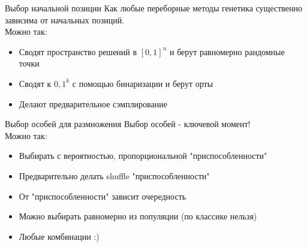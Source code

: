 \documentclass[14pt, fleqn, xcolor={dvipsnames, table}]{beamer}
\begin{document}
\begin{frame}{Выбор начальной позиции}
Как любые переборные методы генетика существенно зависима от начальных позиций. \\
Можно так:
\begin{itemize}
  \item Сводят пространство решений в $[0,1]^n$ и берут равномерно рандомные точки
  \item Сводят к ${0,1}^k$ с помощью бинаризации и берут орты
  \item Делают предварительное сэмплирование
\end{itemize}
\end{frame}

\begin{frame}{Выбор особей для размножения}
Выбор особей - ключевой момент! \\
Можно так:
\begin{itemize}
  \item Выбирать с вероятностью, пропорциональной "приспособленности"
  \item Предварительно делать shuffle "приспособленности"
  \item От "приспособленности" зависит очередность
  \item Можно выбирать равномерно из популяции (по классике нельзя)
  \item Любые комбинации :)
\end{itemize}
\end{frame}
\end{document}
